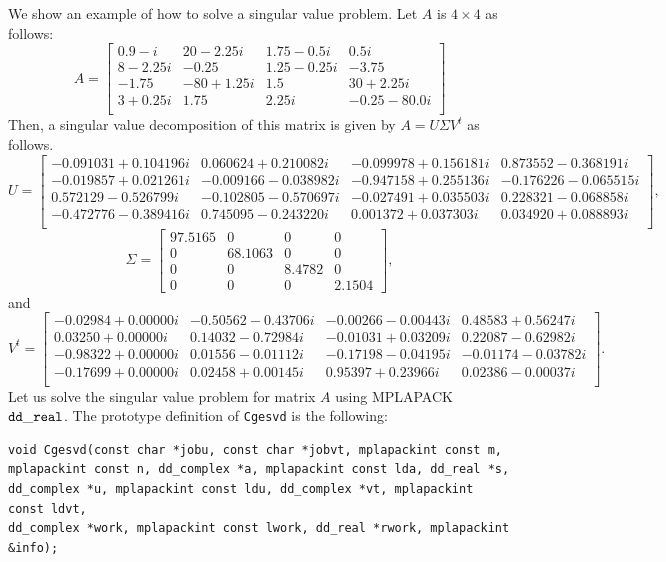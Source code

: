 \documentclass[12pt]{article}
\begin{document}
We show an example of how to solve a singular value problem.
Let $A$ is $4 \times 4$ as follows:
\[
A=\left[\begin{array}{cccc}
0.9-i    & 20-2.25i  & 1.75-0.5i  & 0.5i     \\
8 -2.25i & -0.25     & 1.25-0.25i & -3.75    \\
-1.75    & -80+1.25i & 1.5        & 30+2.25i \\
3+0.25i  & 1.75      & 2.25i      & -0.25-80.0i \\
\end{array}\right]
\]
Then, a singular value decomposition of this matrix is given by $A= U\Sigma V^t$ as follows.
\[
{U}=\left[\begin{array}{cccc}-0.091031 + 0.104196i &  0.060624 + 0.210082i & -0.099978 + 0.156181i &  0.873552 - 0.368191i \\
  -0.019857 + 0.021261i & -0.009166 - 0.038982i & -0.947158 + 0.255136i & -0.176226 - 0.065515i \\
   0.572129 - 0.526799i & -0.102805 - 0.570697i & -0.027491 + 0.035503i &  0.228321 - 0.068858i  \\
  -0.472776 - 0.389416i &  0.745095 - 0.243220i &  0.001372 + 0.037303i  & 0.034920 + 0.088893i \\
\end{array}\right],
\]
\[
\Sigma=\left[\begin{array}{cccc}97.5165 & 0 & 0 & 0\\ 0 & 68.1063 & 0 & 0 \\ 0 & 0 & 8.4782 & 0 \\ 0 & 0 & 0 & 2.1504 \end{array}\right],
\]
and
\[
V^t=\left[\begin{array}{cccc}
-0.02984 + 0.00000i & -0.50562 - 0.43706i & -0.00266 - 0.00443i &   0.48583 + 0.56247i \\
0.03250 + 0.00000i  & 0.14032 - 0.72984i & -0.01031 + 0.03209i &  0.22087 - 0.62982i \\
-0.98322 + 0.00000i &  0.01556 - 0.01112i & -0.17198 - 0.04195i & -0.01174 - 0.03782i \\
-0.17699 + 0.00000i  & 0.02458 + 0.00145i &  0.95397 + 0.23966i &  0.02386 - 0.00037i \\
\end{array}\right].
\]
Let us solve the singular value problem for matrix $A$ using MPLAPACK $\tt dd\_real$.
The prototype definition of {\tt Cgesvd} is the following:
\begin{verbatim}
void Cgesvd(const char *jobu, const char *jobvt, mplapackint const m,
mplapackint const n, dd_complex *a, mplapackint const lda, dd_real *s,
dd_complex *u, mplapackint const ldu, dd_complex *vt, mplapackint const ldvt,
dd_complex *work, mplapackint const lwork, dd_real *rwork, mplapackint &info);
\end{verbatim}
\end{document}
